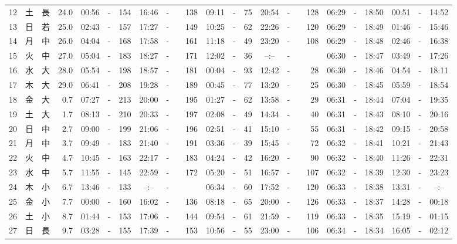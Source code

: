 \documentclass[12pt,a4j]{jsarticle}
\begin{document}
\begin{table}[htbp]
\begin{center}
{\begin{tabular}{|rc|cr|ccrccr|ccrccr|ccc|ccc|}
12 & 土 & 長 & 24.0 &  00:56 &-& 154 &  16:46 &-& 138 &  09:11 &-&  75 &  20:54 &-& 128 & 06:29 & -& 18:50 & 00:51 & -& 14:52 \\
13 & 日 & 若 & 25.0 &  02:43 &-& 157 &  17:27 &-& 149 &  10:25 &-&  62 &  22:26 &-& 120 & 06:29 & -& 18:49 & 01:46 & -& 15:46 \\
14 & 月 & 中 & 26.0 &  04:04 &-& 168 &  17:58 &-& 161 &  11:18 &-&  49 &  23:20 &-& 108 & 06:29 & -& 18:48 & 02:46 & -& 16:38 \\
15 & 火 & 中 & 27.0 &  05:04 &-& 183 &  18:27 &-& 171 &  12:02 &-&  36 &  --:-- &-&~~~~~ & 06:30 & -& 18:47 & 03:49 & -& 17:26 \\
16 & 水 & 大 & 28.0 &  05:54 &-& 198 &  18:57 &-& 181 &  00:04 &-&  93 &  12:42 &-&  28 & 06:30 & -& 18:46 & 04:54 & -& 18:11 \\
17 & 木 & 大 & 29.0 &  06:41 &-& 208 &  19:28 &-& 189 &  00:45 &-&  77 &  13:20 &-&  25 & 06:30 & -& 18:45 & 05:59 & -& 18:54 \\
18 & 金 & 大 &  0.7 &  07:27 &-& 213 &  20:00 &-& 195 &  01:27 &-&  62 &  13:58 &-&  29 & 06:31 & -& 18:44 & 07:04 & -& 19:35 \\
19 & 土 & 大 &  1.7 &  08:13 &-& 210 &  20:33 &-& 197 &  02:08 &-&  49 &  14:34 &-&  40 & 06:31 & -& 18:43 & 08:10 & -& 20:16 \\
20 & 日 & 中 &  2.7 &  09:00 &-& 199 &  21:06 &-& 196 &  02:51 &-&  41 &  15:10 &-&  55 & 06:31 & -& 18:42 & 09:15 & -& 20:58 \\
21 & 月 & 中 &  3.7 &  09:49 &-& 183 &  21:40 &-& 191 &  03:36 &-&  39 &  15:45 &-&  72 & 06:32 & -& 18:41 & 10:21 & -& 21:43 \\
22 & 火 & 中 &  4.7 &  10:45 &-& 163 &  22:17 &-& 183 &  04:24 &-&  42 &  16:20 &-&  90 & 06:32 & -& 18:40 & 11:26 & -& 22:31 \\
23 & 水 & 中 &  5.7 &  11:55 &-& 145 &  22:59 &-& 172 &  05:20 &-&  51 &  16:57 &-& 107 & 06:32 & -& 18:39 & 12:30 & -& 23:23 \\
24 & 木 & 小 &  6.7 &  13:46 &-& 133 &  --:-- &-&~~~~~ &  06:34 &-&  60 &  17:52 &-& 120 & 06:33 & -& 18:38 & 13:31 & -& --:-- \\
25 & 金 & 小 &  7.7 &  00:00 &-& 160 &  16:02 &-& 136 &  08:18 &-&  65 &  20:00 &-& 126 & 06:33 & -& 18:37 & 14:28 & -& 00:18 \\
26 & 土 & 小 &  8.7 &  01:44 &-& 153 &  17:06 &-& 144 &  09:54 &-&  61 &  21:59 &-& 119 & 06:33 & -& 18:35 & 15:19 & -& 01:15 \\
27 & 日 & 長 &  9.7 &  03:28 &-& 155 &  17:39 &-& 153 &  10:56 &-&  55 &  23:00 &-& 106 & 06:34 & -& 18:34 & 16:05 & -& 02:12 \\

\end{tabular}}
\end{center}
\end{table}
\end{document}
